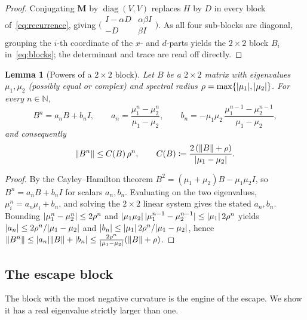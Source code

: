 \documentclass[11pt]{article}
\theoremstyle{plain}
\newtheorem{lemma}{Lemma}[section]
\theoremstyle{definition}
\theoremstyle{remark}
\DeclarePairedDelimiter{\norm}{\lVert}{\rVert}
\DeclarePairedDelimiter{\abs}{\lvert}{\rvert}
\newcommand{\N}{\mathbb{N}}
\DeclareMathOperator{\diag}{diag}
\newcommand{\Mmat}{\mathbf{M}}
\begin{document}
\begin{proof}
Conjugating $\Mmat$ by $\diag(V,V)$ replaces $H$ by $D$ in every
block of~\eqref{eq:recurrence}, giving
$\bigl(\begin{smallmatrix}I-\alpha D&\alpha\beta I\\-D&\beta
I\end{smallmatrix}\bigr)$. As all four sub-blocks are diagonal, grouping
the $i$-th coordinate of the $x$- and $d$-parts yields the $2\times2$
block $B_{i}$ in~\eqref{eq:blocks}; the determinant and trace are read
off directly.
\end{proof}

\begin{lemma}[Powers of a $2\times2$ block]
\label{lem:cayley}
Let $B$ be a $2\times2$ matrix with eigenvalues $\mu_{1},\mu_{2}$
(possibly equal or complex) and spectral radius
$\rho=\max\{\abs{\mu_{1}},\abs{\mu_{2}}\}$. For every $n\in\N$,
\[
  B^{n}=a_{n}B+b_{n}I,\qquad
  a_{n}=\frac{\mu_{1}^{n}-\mu_{2}^{n}}{\mu_{1}-\mu_{2}},\qquad
  b_{n}=-\mu_{1}\mu_{2}\,\frac{\mu_{1}^{n-1}-\mu_{2}^{n-1}}{\mu_{1}-\mu_{2}},
\]
and consequently
\begin{equation}\label{eq:Cbound}
  \norm{B^{n}}\le C(B)\,\rho^{n},
  \qquad
  C(B)\coloneqq\frac{2\,(\norm{B}+\rho)}{\abs{\mu_{1}-\mu_{2}}}.
\end{equation}
\end{lemma}

\begin{proof}
By the Cayley--Hamilton theorem $B^{2}=(\mu_{1}+\mu_{2})B-\mu_{1}\mu_{2}I$,
so $B^{n}=a_{n}B+b_{n}I$ for scalars $a_{n},b_{n}$. Evaluating on the two
eigenvalues, $\mu_{i}^{n}=a_{n}\mu_{i}+b_{n}$, and solving the $2\times2$
linear system gives the stated $a_{n},b_{n}$. Bounding
$\abs{\mu_{1}^{n}-\mu_{2}^{n}}\le2\rho^{n}$ and
$\abs{\mu_{1}\mu_{2}}\,\abs{\mu_{1}^{n-1}-\mu_{2}^{n-1}}
\le\abs{\mu_{1}}\,2\rho^{n}$ yields
$\abs{a_{n}}\le2\rho^{n}/\abs{\mu_{1}-\mu_{2}}$ and
$\abs{b_{n}}\le\abs{\mu_{1}}\,2\rho^{n}/\abs{\mu_{1}-\mu_{2}}$, hence
$\norm{B^{n}}\le\abs{a_{n}}\norm{B}+\abs{b_{n}}
\le\frac{2\rho^{n}}{\abs{\mu_{1}-\mu_{2}}}(\norm{B}+\rho)$.
\end{proof}

\subsection{The escape block}

The block with the most negative curvature is the engine of the escape.
We show it has a real eigenvalue strictly larger than one.
\end{document}
